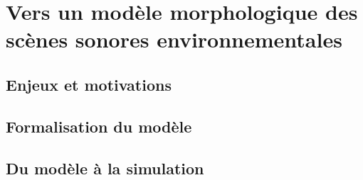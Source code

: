 \chapter{Vers un modèle morphologique des scènes sonores environnementales}\label{ch:psycho_model} %

\section{Enjeux et motivations}

\section{Formalisation du modèle}

\section{Du modèle à la simulation}

